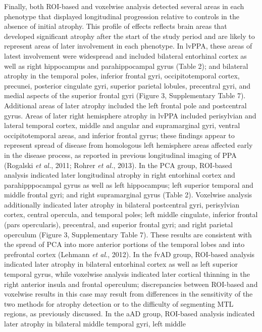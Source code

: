 \documentclass[]{article}
\begin{document}
Finally, both ROI-based and voxelwise analysis detected several areas in
each phenotype that displayed longitudinal progression relative to
controls in the absence of initial atrophy. This profile of effects
reflects brain areas that developed significant atrophy after the start
of the study period and are likely to represent areas of later
involvement in each phenotype. In lvPPA, these areas of latest
involvement were widespread and included bilateral entorhinal cortex as
well as right hippocampus and parahippocampal gyrus (Table 2); and
bilateral atrophy in the temporal poles, inferior frontal gyri,
occipitotemporal cortex, precunei, posterior cingulate gyri, superior
parietal lobules, precentral gyri, and medial aspects of the superior
frontal gyri (Figure 3, Supplementary Table 7). Additional areas of
later atrophy included the left frontal pole and postcentral gyrus.
Areas of later right hemisphere atrophy in lvPPA included perisylvian
and lateral temporal cortex, middle and angular and supramarginal gyri,
ventral occipitotemporal areas, and inferior frontal gyrus; these
findings appear to represent spread of disease from homologous left
hemisphere areas affected early in the disease process, as reported in
previous longitudinal imaging of PPA (Rogalski \emph{et al.}, 2011;
Rohrer \emph{et al.}, 2013). In the PCA group, ROI-based analysis
indicated later longitudinal atrophy in right entorhinal cortex and
parahipppocampal gyrus as well as left hippocampus; left superior
temporal and middle frontal gyri; and right supramarginal gyrus (Table
2). Voxelwise analysis additionally indicated later atrophy in bilateral
postcentral gyri, perisylvian cortex, central opercula, and temporal
poles; left middle cingulate, inferior frontal (pars opercularis),
precentral, and superior frontal gyri; and right parietal operculum
(Figure 3, Supplementary Table 7). These results are consistent with the
spread of PCA into more anterior portions of the temporal lobes and into
prefrontal cortex (Lehmann \emph{et al.}, 2012). In the fvAD group,
ROI-based analysis indicated later atrophy in bilateral entorhinal
cortex as well as left superior temporal gyrus, while voxelwise analysis
indicated later cortical thinning in the right anterior insula and
frontal operculum; discrepancies between ROI-based and voxelwise results
in this case may result from differences in the sensitivity of the two
methods for atrophy detection or to the difficulty of segmenting MTL
regions, as previously discussed. In the aAD group, ROI-based analysis
indicated later atrophy in bilateral middle temporal gyri, left middle
\end{document}
